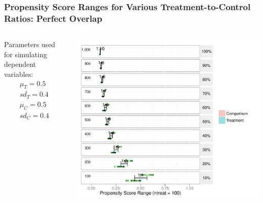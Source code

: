 \documentclass[10pt,handout,mathserif]{beamer}
\begin{document}
\begin{frame}[c]
	\frametitle{Propensity Score Ranges for Various Treatment-to-Control Ratios: Perfect Overlap}
	\begin{columns}
    \begin{column}{0.15\textwidth}
        Parameters used for simulating dependent variables:
    	\begin{equation*}
    	\begin{split}
    	\mu_T = 0.5\\
    	sd_T = 0.4\\
    	\mu_C = 0.5\\
    	sd_C = 0.4
    	\end{split}
    	\end{equation*}
    \end{column}
    \begin{column}{0.85\textwidth}
    	\begin{center}
    	\includegraphics[height=\textheight,keepaspectratio]{../Figures2009/PSRanges-Overlap}
    	\end{center}
	\end{column}
	\end{columns}
\end{frame}
\end{document}
